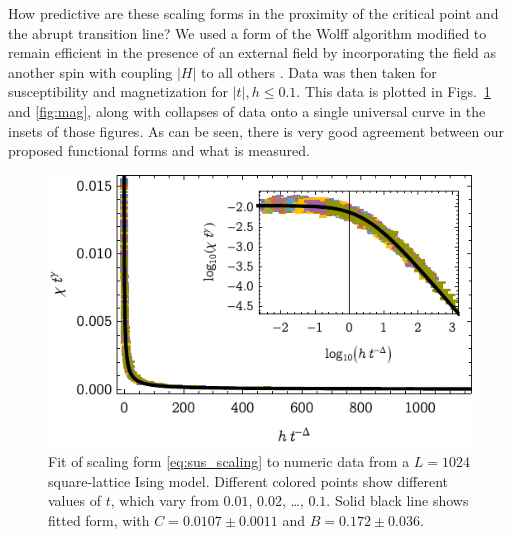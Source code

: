 \documentclass[aps,prl,reprint]{revtex4-1}
\begin{document}
How predictive are these scaling forms in the proximity of the critical point
and the abrupt transition line? We used a form of the Wolff algorithm modified
to remain efficient in the presence of an external field by incorporating the
field as another spin with coupling $|H|$ to all others
\cite{dimitrovic.1991.finite}. Data was then taken for susceptibility and
magnetization for $|t|,h\leq0.1$. This data is plotted in Figs.~\ref{fig:sus}
and \ref{fig:mag}, along with collapses of data onto a single universal curve
in the insets of those figures. As can be seen, there is very good agreement
between our proposed functional forms and what is measured.

\begin{figure}
  \includegraphics{figs/fig_sus-collapse}
  \caption{Fit of scaling form \eqref{eq:sus_scaling} to numeric data from a
  $L=1024$ square-lattice Ising model.
Different colored points show different values of $t$, which vary from
$0.01$, $0.02$, \dots, $0.1$. Solid black line shows fitted form, with
$C=0.0107\pm0.0011$ and $B=0.172\pm0.036$.}
  \label{fig:sus}
\end{figure}
\end{document}
